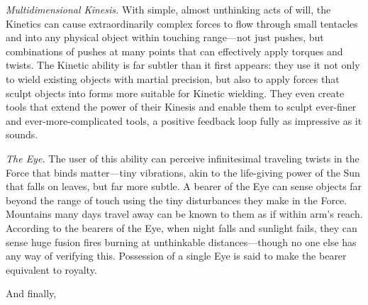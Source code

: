 {
 \textit{Multidimensional Kinesis.} With simple, almost unthinking
acts of will, the Kinetics can cause extraordinarily complex forces to
flow through small tentacles and into any physical object within
touching range---not just pushes, but combinations of pushes at many
points that can effectively apply torques and twists. The Kinetic
ability is far subtler than it first appears: they use it not only to
wield existing objects with martial precision, but also to apply forces
that sculpt objects into forms more suitable for Kinetic wielding. They
even create tools that extend the power of their Kinesis and enable
them to sculpt ever-finer and ever-more-complicated tools, a positive
feedback loop fully as impressive as it sounds.}

{
 \textit{The Eye.} The user of this ability can perceive
infinitesimal traveling twists in the Force that binds matter---tiny
vibrations, akin to the life-giving power of the Sun that falls on
leaves, but far more subtle. A bearer of the Eye can sense objects far
beyond the range of touch using the tiny disturbances they make in the
Force. Mountains many days travel away can be known to them as if
within arm's reach. According to the bearers of the
Eye, when night falls and sunlight fails, they can sense huge fusion
fires burning at unthinkable distances---though no one else has any way
of verifying this. Possession of a single Eye is said to make the
bearer equivalent to royalty.}

{
 And finally,}

